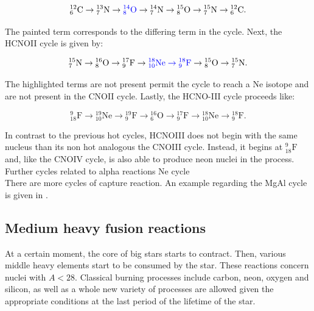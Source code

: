 \documentclass[openany]{book}
\begin{document}
\begin{equation} \label{eq:reaction_HCNO_C}
	\mathrm{{}_{6}^{12}C  \rightarrow {}^{13}_{7}N  \rightarrow \textcolor{blue}{{}^{14}_{8}O}  \rightarrow {}^{14}_{7}N  \rightarrow {}^{15}_{8}O  \rightarrow {}^{15}_{7}N \rightarrow {}^{12}_{6}C}.
\end{equation}

The painted term corresponds to the differing term in the cycle. Next, the HCNOII cycle is given by: 

\begin{equation} \label{eq:reaction_HCNO_N}
	\mathrm{{}_{7}^{15}N  \rightarrow {}^{16}_{8}O  \rightarrow {}^{17}_{9}F  \rightarrow \textcolor{blue}{{}^{18}_{10}Ne  \rightarrow {}^{18}_{9}F}  \rightarrow {}^{15}_{8}O \rightarrow {}^{15}_{7}N  }.
\end{equation}

The highlighted terms are not present permit the cycle to reach a Ne isotope and are not present in the CNOII cycle. Lastly, the HCNO-III cycle proceeds like: 

\begin{equation} \label{eq:reaction_HCNO_O}
	\mathrm{{}_{18}^{9}F  \rightarrow {}^{19}_{10}Ne  \rightarrow {}^{19}_{9}F  \rightarrow {}^{16}_{6}O  \rightarrow {}^{17}_{9}F  \rightarrow {}^{18}_{10}Ne \rightarrow {}^{18}_{9}F  }.
\end{equation}

In contrast to the previous hot cycles, HCNOIII does not begin with the same nucleus than its non hot analogous the CNOIII cycle. Instead, it begins at $\mathrm{{}_{18}^{9}F}$ and, like the CNOIV cycle, is also able to produce neon nuclei in the process. \\

Further cycles related to alpha reactions Ne cycle \cite{kaeppeler_wiescher_giesen_goerres_baraffe_eleid_raiteri_busso_gallino_limongi_et_1994}\\

There are more cycles of capture reaction. An example regarding the MgAl cycle is given in \cite{lotay_doherty_janssens_seweryniak_albers_almaraz-calderon_carpenter_champagne_chiara_hoffman_et_2022}.


\subsection{Medium heavy fusion reactions} \label{sub:mediumHeavyReactions}

At a certain moment, the core of big stars starts to contract. Then, various middle heavy elements start to be consumed by the star. These reactions concern nuclei with $A < 28$. Classical burning processes include carbon, neon, oxygen and silicon, as well as a whole new variety of processes are allowed given the appropriate conditions at the last period of the lifetime of the star. \\
\end{document}
